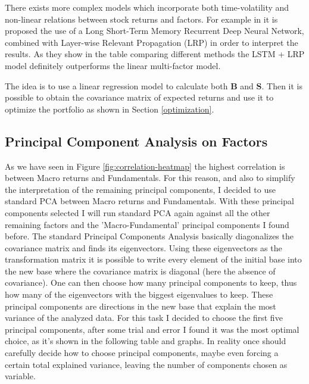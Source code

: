 There exists more complex models which incorporate both time-volatility and non-linear relations between stock returns and factors. For example in \cite{nakagawa} it is proposed the use of a Long Short-Term Memory Recurrent Deep Neural Network, combined with Layer-wise Relevant Propagation (LRP) in order to interpret the results. As they show in the table comparing different methods the LSTM + LRP model definitely outperforms the linear multi-factor model.

The idea is to use a linear regression model to calculate both $\mathbf{B}$ and $\mathbf{S}$. Then it is possible to obtain the covariance matrix of expected returns and use it to optimize the portfolio as shown in Section \ref{optimization}.

\subsection{Principal Component Analysis on Factors}
\label{pca}
As we have seen in Figure \ref{fig:correlation-heatmap} the highest correlation is between Macro returns and Fundamentals. For this reason, and also to simplify the interpretation of the remaining principal components, I decided to use standard PCA between Macro returns and Fundamentals. With these principal components selected I will run standard PCA again against all the other remaining factors and the 'Macro-Fundamental' principal components I found before.
The standard Principal Components Analysis basically diagonalizes the covariance matrix and finds its eigenvectors. Using these eigenvectors as the transformation matrix it is possible to write every element of the initial base into the new base where the covariance matrix is diagonal (here the absence of covariance). One can then choose how many principal components to keep, thus how many of the eigenvectors with the biggest eigenvalues to keep. These principal components are directions in the new base that explain the most variance of the analyzed data. For this task I decided to choose the first five principal components, after some trial and error I found it was the most optimal choice, as it's shown in the following table and graphs. In reality once should carefully decide how to choose principal components, maybe even forcing a certain total explained variance, leaving the number of components chosen as variable.

